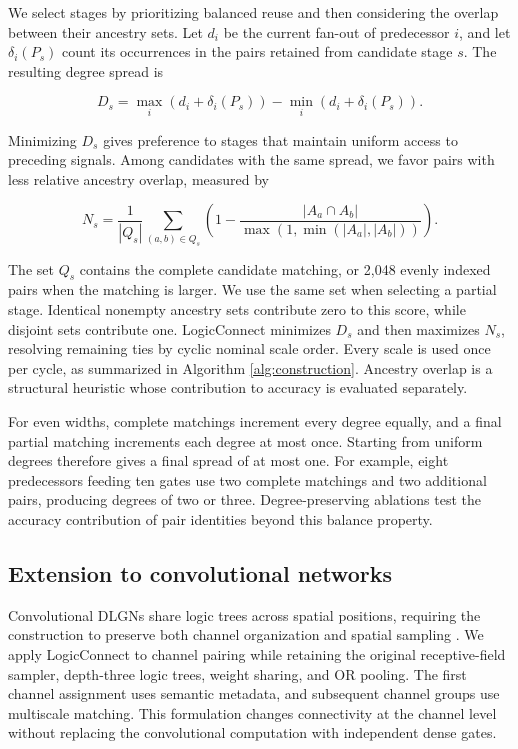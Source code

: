 We select stages by prioritizing balanced reuse and then considering the overlap between their ancestry sets. Let $d_i$ be the current fan-out of predecessor $i$, and let $\delta_i(P_s)$ count its occurrences in the pairs retained from candidate stage $s$. The resulting degree spread is

\begin{equation}
D_s=\max_i(d_i+\delta_i(P_s))-\min_i(d_i+\delta_i(P_s)).
\label{eq:degree}
\end{equation}

Minimizing $D_s$ gives preference to stages that maintain uniform access to preceding signals. Among candidates with the same spread, we favor pairs with less relative ancestry overlap, measured by

\begin{equation}
N_s=\frac{1}{|Q_s|}\sum_{(a,b)\in Q_s}\left(1-\frac{|A_a\cap A_b|}{\max(1,\min(|A_a|,|A_b|))}\right).
\label{eq:novelty}
\end{equation}

The set $Q_s$ contains the complete candidate matching, or 2,048 evenly indexed pairs when the matching is larger. We use the same set when selecting a partial stage. Identical nonempty ancestry sets contribute zero to this score, while disjoint sets contribute one. LogicConnect minimizes $D_s$ and then maximizes $N_s$, resolving remaining ties by cyclic nominal scale order. Every scale is used once per cycle, as summarized in Algorithm \ref{alg:construction}. Ancestry overlap is a structural heuristic whose contribution to accuracy is evaluated separately.



For even widths, complete matchings increment every degree equally, and a final partial matching increments each degree at most once. Starting from uniform degrees therefore gives a final spread of at most one. For example, eight predecessors feeding ten gates use two complete matchings and two additional pairs, producing degrees of two or three. Degree-preserving ablations test the accuracy contribution of pair identities beyond this balance property.

\subsection{Extension to convolutional networks}

Convolutional DLGNs share logic trees across spatial positions, requiring the construction to preserve both channel organization and spatial sampling \cite{petersen2024}. We apply LogicConnect to channel pairing while retaining the original receptive-field sampler, depth-three logic trees, weight sharing, and OR pooling. The first channel assignment uses semantic metadata, and subsequent channel groups use multiscale matching. This formulation changes connectivity at the channel level without replacing the convolutional computation with independent dense gates.

